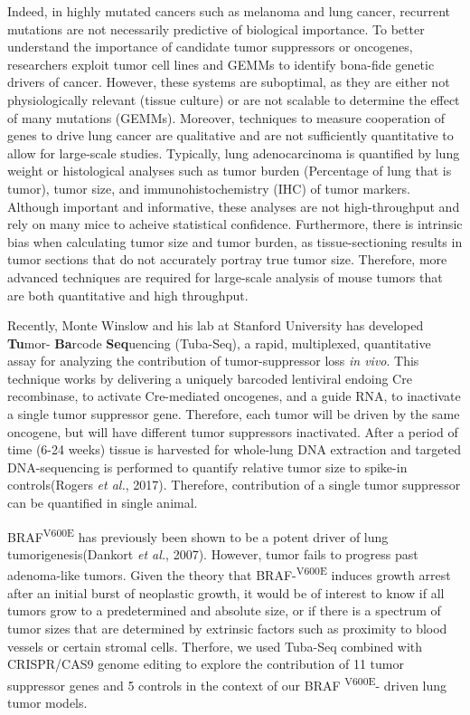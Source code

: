 Indeed, in highly mutated cancers such as melanoma and lung cancer, recurrent mutations are not necessarily predictive of biological importance.
To better understand the importance of candidate tumor suppressors or oncogenes, researchers exploit tumor cell lines and GEMMs to identify bona-fide genetic drivers of cancer.
However, these systems are suboptimal, as they are either not physiologically relevant (tissue culture) or are not scalable to determine the effect of many mutations (GEMMs).
Moreover, techniques to measure cooperation of genes to drive lung cancer are qualitative and are not sufficiently quantitative to allow for large-scale studies.
Typically, lung adenocarcinoma is quantified by lung weight or histological analyses such as tumor burden (Percentage of lung that is tumor), tumor size, and immunohistochemistry (IHC) of tumor markers.
Although important and informative, these analyses are not high-throughput and rely on many mice to acheive statistical confidence. Furthermore, there is intrinsic bias when calculating tumor size and tumor burden, as tissue-sectioning results in tumor sections that do not accurately portray true tumor size. Therefore, more advanced techniques are required for large-scale analysis of mouse tumors that are both quantitative and high throughput.

Recently, Monte Winslow and his lab at Stanford University has developed \textbf{Tu}mor- \textbf{Ba}rcode \textbf{Seq}uencing (Tuba-Seq), a rapid, multiplexed, quantitative assay for analyzing the contribution of tumor-suppressor loss \emph{in vivo}.
This technique works by delivering a uniquely barcoded lentiviral endoing Cre recombinase, to activate Cre-mediated oncogenes, and a guide RNA, to inactivate a single tumor suppressor gene.
Therefore, each tumor will be driven by the same oncogene, but will have different tumor suppressors inactivated.
After a period of time (6-24 weeks) tissue is harvested for whole-lung DNA extraction and targeted DNA-sequencing is performed to quantify relative tumor size to spike-in controls(Rogers \emph{et al.}, 2017).
Therefore, contribution of a single tumor suppressor can be quantified in single animal.

BRAF\textsuperscript{V600E} has previously been shown to be a potent driver of lung tumorigenesis(Dankort \emph{et al.}, 2007).
However, tumor fails to progress past adenoma-like tumors.
Given the theory that BRAF-\textsuperscript{V600E} induces growth arrest after an initial burst of neoplastic growth, it would be of interest to know if all tumors grow to a predetermined and absolute size, or if there is a spectrum of tumor sizes that are determined by extrinsic factors such as proximity to blood vessels or certain stromal cells.
Therfore, we used Tuba-Seq combined with CRISPR/CAS9 genome editing to explore the contribution of 11 tumor suppressor genes and 5 controls in the context of our BRAF \textsuperscript{V600E}- driven lung tumor models.

